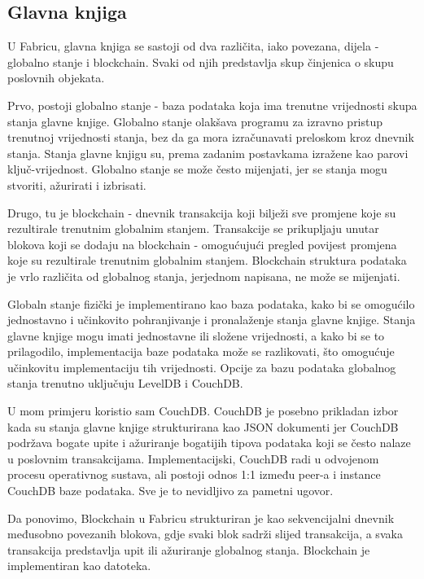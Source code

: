 \documentclass[times, utf8, diplomski]{fer}
\begin{document}
\subsection{Glavna knjiga}
U Fabricu, glavna knjiga se sastoji od dva različita, iako povezana, dijela - globalno stanje i blockchain. Svaki od njih predstavlja skup činjenica o skupu poslovnih objekata.

Prvo, postoji globalno stanje - baza podataka koja ima trenutne vrijednosti skupa stanja glavne knjige. Globalno stanje olakšava programu za izravno pristup trenutnoj vrijednosti stanja,  bez da ga mora izračunavati preloskom kroz dnevnik stanja.  Stanja glavne knjigu su, prema zadanim postavkama izražene kao parovi ključ-vrijednost. Globalno stanje se može često mijenjati, jer se stanja mogu stvoriti, ažurirati i izbrisati.

Drugo, tu je blockchain - dnevnik transakcija koji bilježi sve promjene koje su rezultirale trenutnim globalnim stanjem. Transakcije se prikupljaju unutar blokova koji se dodaju na blockchain - omogućujući pregled povijest promjena koje su rezultirale trenutnim globalnim stanjem. Blockchain struktura podataka je vrlo različita od globalnog stanja, jerjednom napisana, ne može se mijenjati.

Globaln stanje fizički je implementirano kao baza podataka, kako bi se omogućilo jednostavno i učinkovito pohranjivanje i pronalaženje stanja glavne knjige. Stanja glavne knjige mogu imati jednostavne ili složene vrijednosti, a kako bi se to prilagodilo, implementacija baze podataka može se razlikovati,  što omogućuje učinkovitu implementaciju tih vrijednosti. Opcije za bazu podataka globalnog stanja trenutno uključuju LevelDB i CouchDB.

U mom primjeru koristio sam CouchDB.  CouchDB je posebno prikladan izbor kada su stanja glavne knjige strukturirana kao JSON dokumenti jer CouchDB podržava bogate upite i ažuriranje bogatijih tipova podataka koji se često nalaze u poslovnim transakcijama.  Implementacijski,  CouchDB radi u odvojenom procesu operativnog sustava, ali postoji odnos 1:1 između peer-a i instance CouchDB baze podataka. Sve je to nevidljivo za pametni ugovor.

Da ponovimo, Blockchain u Fabricu strukturiran je kao sekvencijalni dnevnik međusobno povezanih blokova, gdje svaki blok sadrži slijed transakcija, a svaka transakcija predstavlja upit ili ažuriranje globalnog stanja.  Blockchain je implementiran kao datoteka. 
\end{document}
